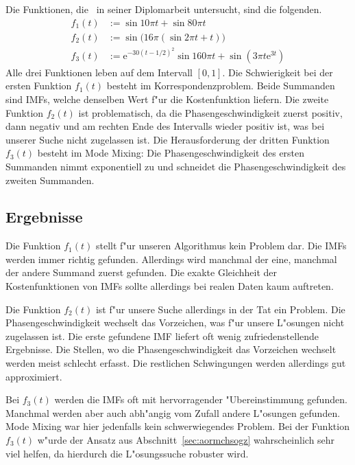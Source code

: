 \documentclass[a4paper]{scrartcl}
\newcommand{\ee}{{\mathrm{e}}}
\begin{document}
Die Funktionen, die~\citeauthor{rudi2010} in seiner Diplomarbeit \citep[S.~28--32]{rudi2010} untersucht, sind die folgenden.
\begin{align*}
f_1(t) &:= \sin 10\pi t + \sin 80\pi t \\
f_2(t) &:= \sin\big(16\pi(\sin 2\pi t+t)\big) \\
f_3(t) &:= \ee^{-30(t-1/2)^2}\sin 160\pi t + \sin(3\pi t\ee^{3t})
\end{align*}
Alle drei Funktionen leben auf dem Intervall $[0,1]$. 
Die Schwierigkeit bei der ersten Funktion $f_1(t)$ besteht im Korrespondenzproblem. 
Beide Summanden sind IMFs, welche denselben Wert f"ur die Kostenfunktion liefern. 
Die zweite Funktion $f_2(t)$ ist problematisch, da die Phasengeschwindigkeit zuerst positiv, dann negativ und am rechten Ende des Intervalls wieder positiv ist, was bei unserer Suche nicht zugelassen ist. 
Die Herausforderung der dritten Funktion $f_3(t)$ besteht im Mode Mixing: Die Phasengeschwindigkeit des ersten Summanden nimmt exponentiell zu und schneidet die Phasengeschwindigkeit des zweiten Summanden. 


\subsection{Ergebnisse}

Die Funktion $f_1(t)$ stellt f"ur unseren Algorithmus kein Problem dar. 
Die IMFs werden immer richtig gefunden. 
Allerdings wird manchmal der eine, manchmal der andere Summand zuerst gefunden. 
Die exakte Gleichheit der Kostenfunktionen von IMFs sollte allerdings bei realen Daten kaum auftreten. 

Die Funktion $f_2(t)$ ist f"ur unsere Suche allerdings in der Tat ein Problem. 
Die Phasengeschwindigkeit wechselt das Vorzeichen, was f"ur unsere L"osungen nicht zugelassen ist. 
Die erste gefundene IMF liefert oft wenig zufriedenstellende Ergebnisse. 
Die Stellen, wo die Phasengeschwindigkeit das Vorzeichen wechselt werden meist schlecht erfasst. 
Die restlichen Schwingungen werden allerdings gut approximiert. 

Bei $f_3(t)$ werden die IMFs oft mit hervorragender "Ubereinstimmung gefunden. 
Manchmal werden aber auch abh"angig vom Zufall andere L"osungen gefunden. 
Mode Mixing war hier jedenfalls kein schwerwiegendes Problem. 
Bei der Funktion $f_3(t)$ w"urde der Ansatz aus Abschnitt~\ref{sec:aormchsogz} wahrscheinlich sehr viel helfen, da hierdurch die L"osungssuche robuster wird. 
\end{document}
